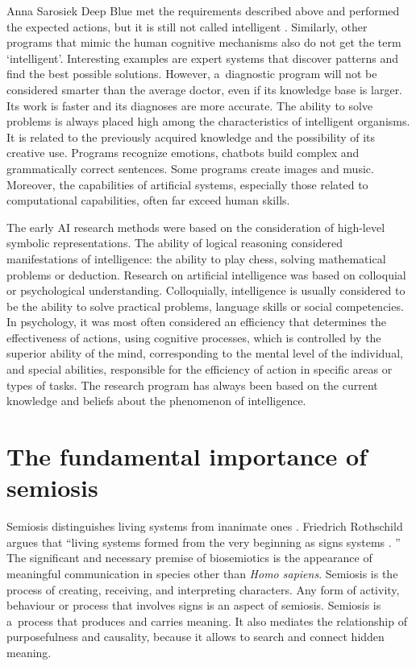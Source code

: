 \begin{artengenv}{Anna Sarosiek}
Deep Blue met the requirements described above and performed the expected actions, but it is still not called intelligent
\parencite[][]{noauthor_deep_2012}. %
 Similarly, other programs that mimic the human cognitive mechanisms also do not get the term ‘intelligent’. Interesting examples are expert systems that discover patterns and find the best possible solutions. However, a~diagnostic program will not be considered smarter than the average doctor, even if its knowledge base is larger. Its work is faster and its diagnoses are more accurate. The ability to solve problems is always placed high among the characteristics of intelligent organisms. It is related to the previously acquired knowledge and the possibility of its creative use. Programs recognize emotions, chatbots build complex and grammatically correct sentences. Some programs create images and music. Moreover, the capabilities of artificial systems, especially those related to computational capabilities, often far exceed human skills.

The early AI research methods were based on the consideration of high-level symbolic representations. The ability of logical reasoning considered manifestations of intelligence: the ability to play chess, solving mathematical problems or deduction. Research on artificial intelligence was based on colloquial or psychological understanding. Colloquially, intelligence is usually considered to be the ability to solve practical problems, language skills or social competencies. In psychology, it was most often considered an efficiency that determines the effectiveness of actions, using cognitive processes, which is controlled by the superior ability of the mind, corresponding to the mental level of the individual, and special abilities, responsible for the efficiency of action in specific areas or types of tasks. The research program has always been based on the current knowledge and beliefs about the phenomenon of intelligence.

\section*{The fundamental importance of semiosis}
Semiosis distinguishes living systems from inanimate ones
\parencite[][]{sebeok_communication_1988}. %
 Friedrich Rothschild argues that ``living systems formed from the very beginning as signs systems 
\parencite[][]{rothschild_laws_1962}.%
'' The significant and necessary premise of biosemiotics is the appearance of meaningful communication in species other than \textit{Homo sapiens}. Semiosis is the process of creating, receiving, and interpreting characters. Any form of activity, behaviour or process that involves signs is an aspect of semiosis. Semiosis is a~process that produces and carries meaning. It also mediates the relationship of purposefulness and causality, because it allows to search and connect hidden meaning.


\end{artengenv}
